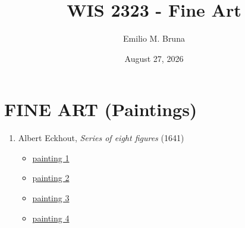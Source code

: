 \documentclass[
  12pt,
  letterpaper,
  DIV=11,
  numbers=noendperiod]{scrreprt}
\title{WIS 2323 - Fine Art}
\author{Emilio M. Bruna}
\date{August 27, 2026}
\providecommand{\tightlist}{%
  \setlength{\itemsep}{0pt}\setlength{\parskip}{0pt}}
\begin{document}
\maketitle


\section{FINE ART (Paintings)}\label{fine-art-paintings}

\vspace{0.3cm}

\begin{enumerate}
\def\labelenumi{\arabic{enumi}.}
\item
  Albert Eckhout, \emph{Series of eight figures} (1641)

  \begin{itemize}
  \tightlist
  \item
    \href{https://en.wikipedia.org/wiki/File:Albert_Eckhout_-_Mameluca.JPG}{painting
    1}
  \item
    \href{https://en.wikipedia.org/wiki/File:Albert_Eckhout_painting.jpg}{painting
    2}
  \item
    \href{https://en.wikipedia.org/wiki/File:MulatoAE.jpg}{painting 3}
  \item
    \href{https://en.wikipedia.org/wiki/File:Albert_Eckhout_Tapuia_woman_1641.jpg}{painting
    4}
  \end{itemize}
\end{enumerate}
\end{document}
